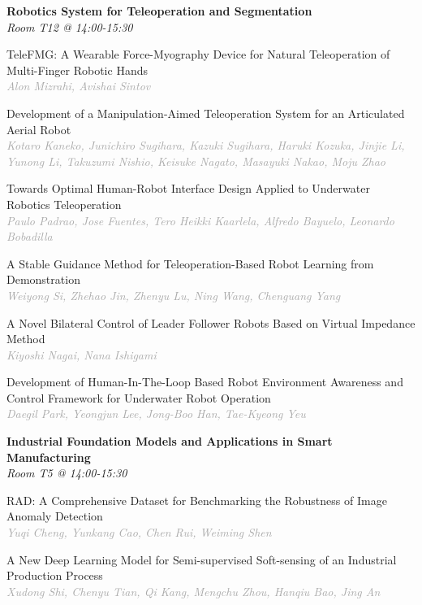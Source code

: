 \begin{multicols*}{2}
\normalsize \textbf{Robotics System for Teleoperation and Segmentation}\\
\small \textit{Room T12 @ 14:00-15:30}

\small TeleFMG: A Wearable Force-Myography Device for Natural Teleoperation of Multi-Finger Robotic Hands\\ 
\footnotesize \textcolor{darkgray}{\textit{Alon Mizrahi, Avishai  Sintov}}

\small Development of a Manipulation-Aimed Teleoperation System for an Articulated Aerial Robot\\ 
\footnotesize \textcolor{darkgray}{\textit{Kotaro Kaneko, Junichiro  Sugihara, Kazuki  Sugihara, Haruki  Kozuka, Jinjie  Li, Yunong  Li, Takuzumi  Nishio, Keisuke  Nagato, Masayuki  Nakao, Moju  Zhao}}

\small Towards Optimal Human-Robot Interface Design Applied to Underwater Robotics Teleoperation\\ 
\footnotesize \textcolor{darkgray}{\textit{Paulo Padrao, Jose  Fuentes, Tero Heikki  Kaarlela, Alfredo  Bayuelo, Leonardo  Bobadilla}}

\small A Stable Guidance Method for Teleoperation-Based Robot Learning from Demonstration\\ 
\footnotesize \textcolor{darkgray}{\textit{Weiyong Si, Zhehao  Jin, Zhenyu  Lu, Ning  Wang, Chenguang  Yang}}

\small A Novel Bilateral Control of Leader Follower Robots Based on Virtual Impedance Method\\ 
\footnotesize \textcolor{darkgray}{\textit{Kiyoshi Nagai, Nana  Ishigami}}

\small Development of Human-In-The-Loop Based Robot Environment Awareness and Control Framework for Underwater Robot Operation\\ 
\footnotesize \textcolor{darkgray}{\textit{Daegil Park, Yeongjun  Lee, Jong-Boo  Han, Tae-Kyeong  Yeu}}

\normalsize \textbf{Industrial Foundation Models and Applications in Smart Manufacturing}\\
\small \textit{Room T5 @ 14:00-15:30}

\small RAD: A Comprehensive Dataset for Benchmarking the Robustness of Image Anomaly Detection\\ 
\footnotesize \textcolor{darkgray}{\textit{Yuqi Cheng, Yunkang  Cao, Chen  Rui, Weiming  Shen}}

\small A New Deep Learning Model for Semi-supervised Soft-sensing of an Industrial Production Process\\ 
\footnotesize \textcolor{darkgray}{\textit{Xudong Shi, Chenyu  Tian, Qi  Kang, Mengchu  Zhou, Hanqiu  Bao, Jing  An}}


\end{multicols*}
